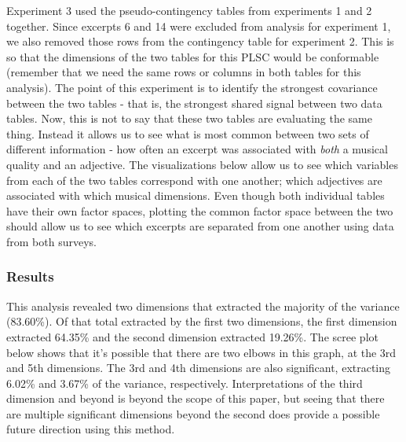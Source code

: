 \documentclass[
  english,
  man,floatsintext]{apa6}
\begin{document}
Experiment 3 used the pseudo-contingency tables from experiments 1 and 2 together. Since excerpts 6 and 14 were excluded from analysis for experiment 1, we also removed those rows from the contingency table for experiment 2. This is so that the dimensions of the two tables for this PLSC would be conformable (remember that we need the same rows or columns in both tables for this analysis). The point of this experiment is to identify the strongest covariance between the two tables - that is, the strongest shared signal between two data tables. Now, this is not to say that these two tables are evaluating the same thing. Instead it allows us to see what is most common between two sets of different information - how often an excerpt was associated with \emph{both} a musical quality and an adjective. The visualizations below allow us to see which variables from each of the two tables correspond with one another; which adjectives are associated with which musical dimensions. Even though both individual tables have their own factor spaces, plotting the common factor space between the two should allow us to see which excerpts are separated from one another using data from both surveys.

\hypertarget{results-1}{%
\subsubsection{Results}\label{results-1}}

This analysis revealed two dimensions that extracted the majority of the variance (83.60\%). Of that total extracted by the first two dimensions, the first dimension extracted 64.35\% and the second dimension extracted 19.26\%. The scree plot below shows that it's possible that there are two elbows in this graph, at the 3rd and 5th dimensions. The 3rd and 4th dimensions are also significant, extracting 6.02\% and 3.67\% of the variance, respectively. Interpretations of the third dimension and beyond is beyond the scope of this paper, but seeing that there are multiple significant dimensions beyond the second does provide a possible future direction using this method.
\end{document}
